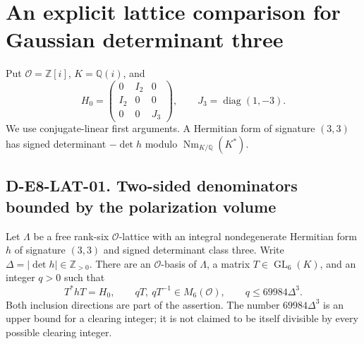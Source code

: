 \section{An explicit lattice comparison for Gaussian determinant three}
\label{sec:gaussian-nonsplit-lattice}

Put $\mathcal O=\mathbb Z[i]$, $K=\mathbb Q(i)$, and
\[
 H_0=\begin{pmatrix}0&I_2&0\\I_2&0&0\\0&0&J_3\end{pmatrix},
             \qquad J_3=\operatorname{diag}(1,-3).
\]
We use conjugate-linear first arguments.  A Hermitian form of
signature $(3,3)$ has signed determinant $-\det h$ modulo
$\operatorname{Nm}_{K/\mathbb Q}(K^*)$.

\subsection*{D-E8-LAT-01. Two-sided denominators bounded by the polarization volume}

Let $\Lambda$ be a free rank-six $\mathcal O$-lattice with an
integral nondegenerate Hermitian form $h$ of signature $(3,3)$
and signed determinant class three.  Write
$\Delta=|\det h|\in\mathbb Z_{>0}$.  There are an
$\mathcal O$-basis of $\Lambda$, a matrix $T\in\operatorname{GL}_6(K)$,
and an integer $q>0$ such that
\[
 T^*hT=H_0,\qquad qT,\ qT^{-1}\in M_6(\mathcal O),\qquad
                        q\le69984\Delta^3.                  \tag{LAT.1}
\]
Both inclusion directions are part of the assertion.  The number
$69984\Delta^3$ is an upper bound for a clearing integer; it is
not claimed to be itself divisible by every possible clearing
integer.

